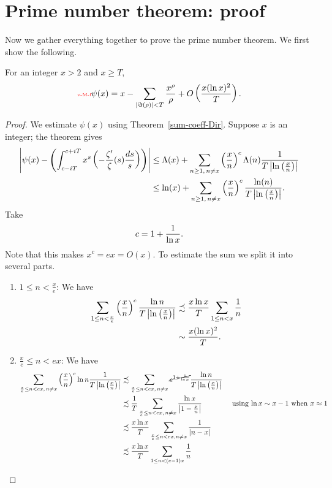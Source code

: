 \section{Prime number theorem: proof}
Now we gather everything together to prove the prime number theorem. We first show the following.
\begin{thm}
For an integer $x>2$ and $x\ge T$,
\begin{equation}\llabel{v-M-f}
\psi(x)= x-\sum_{|\Im(\rh)|<T}\frac{x^{\rh}}{\rh}
+O\pa{
\frac{x(\ln x)^2}{T}%
}.
\end{equation}
\end{thm}
\begin{proof}
 We estimate $\psi(x)$ using Theorem~\ref{sum-coeff-Dir}. Suppose $x$ is an integer; the theorem gives
\begin{align*}
\left| {\psi(x)-\left( {
\int_{c-iT}^{c+iT} x^s\left( {-\frac{\zeta'}{\zeta}(s)\frac{ds}s
} \right)} \right)} \right|&\le
\Lambda(x)+
\sum_{n\ge 1,\,n\ne x} \left( {\frac{x}{n}} \right)^c\Lambda(n)\frac{1}{T\left| {\ln\left( {\frac{x}{n}} \right)} \right|}\\
&\le 
\ln(x)+\sum_{n\ge 1,\,n\ne x}\left( {\frac{x}{n}} \right)^c\frac{\ln(n)}{T\left| {\ln\left( {\frac{x}{n}} \right)} \right|}.
\end{align*}
Take
\[
c=1+\frac{1}{\ln x}.
\]
Note that this makes $x^c=ex=O(x)$. 
To estimate the sum we split it into several parts.
\begin{enumerate}
\item
$1\le n< \frac{x}{e}$: We have
\begin{align*}
\sum_{1\le n<\frac xe} \left( {\frac{x}{n}} \right)^c \frac{\ln n}{T\left| {\ln\left( {\frac{x}{n}} \right)} \right|}
&\precsim \frac{x\ln x}{T}\sum_{1\le n<x}\frac{1}{n}\\
&\sim \frac{x(\ln x)^2}{T}.
\end{align*}
\item
$\frac xe\le n< ex$: We have
\begin{align*}
\sum_{\frac xe\le n<ex,\,n\ne x}\pf xn^c \ln n\frac{1}{T\ab{\ln\pf xn}}
&\precsim \sum_{\frac xe\le n<ex,\,n\ne x} \cancel{e^{1+\rc{\ln x}}} \frac{\ln n}{T\ab{\ln\pf xn}}\\
&\precsim \rc{T}\sum_{\frac xe\le n<ex,\,n\ne x}\frac{\ln x}{\ab{1-\frac xn}}&\text{ using $\ln x\sim x-1$ when $x\approx 1$}\\
&\precsim \frac{x\ln x}{T}\sum_{\frac xe\le n<ex,n\ne x}\frac{1}{|n-x|}\\
&\precsim\frac{x\ln x}{T}\sum_{1\le n< (e-1)x}\frac{1}{n}\\

\end{align*}
\end{enumerate}
\end{proof}

